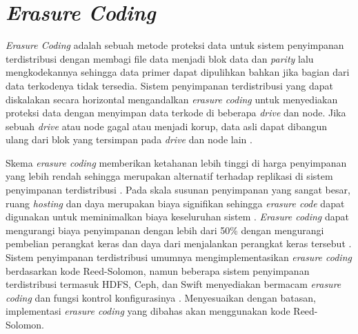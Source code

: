 \section{\textit{Erasure Coding}}
\label{sec:erasure-coding}

\textit{Erasure Coding} adalah sebuah metode proteksi data untuk sistem penyimpanan terdistribusi dengan membagi file data menjadi blok data dan \textit{parity} lalu mengkodekannya sehingga data primer dapat dipulihkan bahkan jika bagian dari data terkodenya tidak tersedia. Sistem penyimpanan terdistribusi yang dapat diskalakan secara horizontal mengandalkan \textit{erasure coding} untuk menyediakan proteksi data dengan menyimpan data terkode di beberapa \textit{drive} dan node. Jika sebuah \textit{drive} atau node gagal atau menjadi korup, data asli dapat dibangun ulang dari blok yang tersimpan pada \textit{drive} dan node lain \parencite{minio2022erasure}.

Skema \textit{erasure coding} memberikan ketahanan lebih tinggi di harga penyimpanan yang lebih rendah sehingga merupakan alternatif terhadap replikasi di sistem penyimpanan terdistribusi \parencite{silberstein2014lazy}. Pada skala susunan penyimpanan yang sangat besar, ruang \textit{hosting} dan daya merupakan biaya signifikan sehingga \textit{erasure code} dapat digunakan untuk meminimalkan biaya keseluruhan sistem \parencite{manasse2009reed}. \textit{Erasure coding} dapat mengurangi biaya penyimpanan dengan lebih dari 50\% dengan mengurangi pembelian perangkat keras dan daya dari menjalankan perangkat keras tersebut \parencite{huang2012erasure}. Sistem penyimpanan terdistribusi umumnya mengimplementasikan \textit{erasure coding} berdasarkan kode Reed-Solomon, namun beberapa sistem penyimpanan terdistribusi termasuk HDFS, Ceph, dan Swift menyediakan bermacam \textit{erasure coding} dan fungsi kontrol konfigurasinya \parencite{kim2021erasure}. Menyesuaikan dengan batasan, implementasi \textit{erasure coding} yang dibahas akan menggunakan kode Reed-Solomon.




